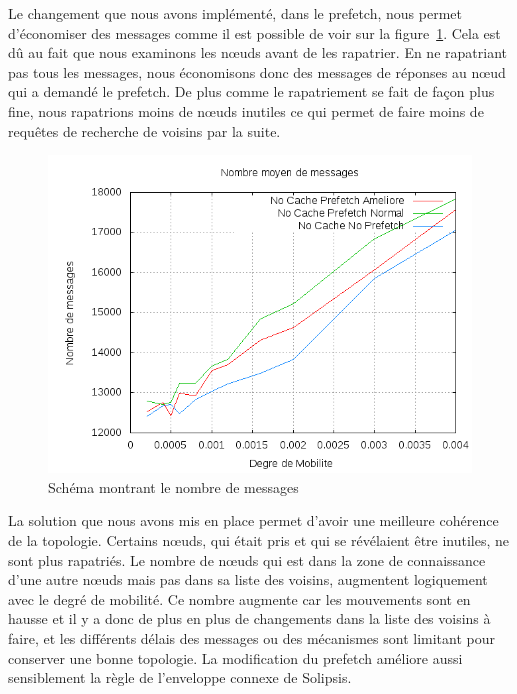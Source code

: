 \par Le changement que nous avons implémenté, dans le prefetch, nous permet d'économiser des messages comme il est possible de voir sur la figure~\ref{courbeNbMessPrefetch}. Cela est dû au fait que nous examinons les nœuds avant de les rapatrier. En ne rapatriant pas tous les messages, nous économisons donc des messages de réponses au nœud qui a demandé le prefetch. De plus comme le rapatriement se fait de façon plus fine, nous rapatrions moins de nœuds inutiles ce qui permet de faire moins de requêtes de recherche de voisins par la suite.
	\begin{figure}[!h]
        \centering
        \includegraphics[scale=0.5]{../CacheCode/SolipsisPeersim/resultats/Courbes/Courbes_Final_Rapport/Nombre_Messages_Prefetchs.png}
        \caption{Schéma montrant le nombre de messages}
        \label{courbeNbMessPrefetch}
        \end{figure}

\par La solution que nous avons mis en place permet d'avoir une meilleure cohérence de la topologie. Certains nœuds, qui était pris et qui se révélaient être inutiles, ne sont plus rapatriés. Le nombre de nœuds qui est dans la zone de connaissance d'une autre nœuds mais pas dans sa liste des voisins, augmentent logiquement avec le degré de mobilité. Ce nombre augmente car les mouvements sont en hausse et il y a donc de plus en plus de changements dans la liste des voisins à faire, et les différents délais des messages ou des mécanismes sont limitant pour conserver une bonne topologie. La modification du prefetch améliore aussi sensiblement la règle de l'enveloppe connexe de Solipsis.

